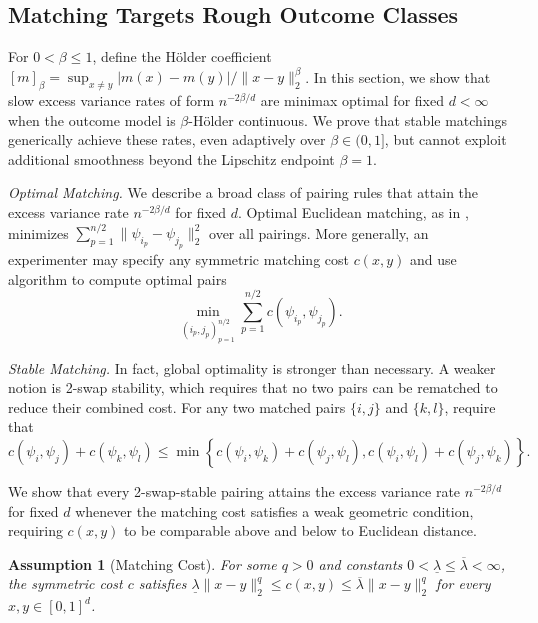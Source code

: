 \documentclass[letterpaper,12pt]{article}
\newtheorem{assumption}[thm]{Assumption}
\theoremstyle{definition}
\numberwithin{equation}{section}
\newcommand{\norm}[1]{\lVert#1\rVert}
\begin{document}
\subsection{Matching Targets Rough Outcome Classes}\label{subsection:rough-classes}

For $0<\beta\leq1$, define the H\"older coefficient $[m]_\beta=\sup_{x\neq y}|m(x)-m(y)|/\norm{x-y}_2^\beta$.
In this section, we show that slow excess variance rates of form $n^{-2\beta/d}$ are minimax optimal for fixed $d < \infty$ when the outcome model is $\beta$-H\"older continuous.
We prove that stable matchings generically achieve these rates, even adaptively over $\beta\in(0,1]$, but cannot exploit additional smoothness beyond the Lipschitz endpoint $\beta=1$.

\medskip

\emph{Optimal Matching.} We describe a broad class of pairing rules that attain the excess variance rate $n^{-2\beta/d}$ for fixed $d$.
Optimal Euclidean matching, as in \citet{bai2021inference}, minimizes $\sum_{p=1}^{n/2}\|\psi_{i_p}-\psi_{j_p}\|_2^2$ over all pairings.
More generally, an experimenter may specify any symmetric matching cost $c(x,y)$ and use \citet{derigs1988} algorithm to compute optimal pairs 
\begin{equation}
\min_{(i_p,j_p)_{p=1}^{n/2}}\sum_{p=1}^{n/2}c(\psi_{i_p},\psi_{j_p}).
\end{equation}

\emph{Stable Matching.}
In fact, global optimality is stronger than necessary.
A weaker notion is 2-swap stability, which requires that no two pairs can be rematched to reduce their combined cost.
For any two matched pairs $\{i,j\}$ and $\{k,l\}$, require that
\begin{equation}\label{equation:swap-stability}
c(\psi_i,\psi_j)+c(\psi_k,\psi_l) \leq \min\left\{ c(\psi_i,\psi_k)+c(\psi_j,\psi_l), c(\psi_i,\psi_l)+c(\psi_j,\psi_k) \right\}.
\end{equation}

We show that every 2-swap-stable pairing attains the excess variance rate $n^{-2\beta/d}$ for fixed $d$ whenever the matching cost satisfies a weak geometric condition, requiring $c(x,y)$ to be comparable above and below to Euclidean distance.

\begin{assumption}[Matching Cost]\label{assumption:matching-cost}
For some $q>0$ and constants $0<\underline\lambda\leq\overline\lambda<\infty$, the symmetric cost $c$ satisfies $\underline\lambda\|x-y\|_2^q\leq c(x,y)\leq\overline\lambda\|x-y\|_2^q$ for every $x,y\in[0,1]^d$.
\end{assumption}
\end{document}
